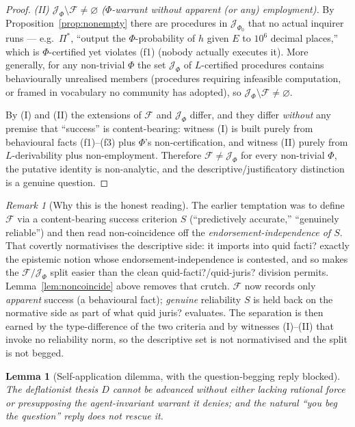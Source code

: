 \documentclass{amsart}
\theoremstyle{definition}
\theoremstyle{plain}
\newtheorem{lemma}{Lemma}
\theoremstyle{remark}
\newtheorem{remark}{Remark}
\begin{document}
\begin{proof}
\emph{(II) $\mathcal{J}_\Phi\setminus\mathcal{F}\neq\varnothing$
($\Phi$-warrant without apparent (or any) employment).} By
Proposition~\ref{prop:nonempty} there are procedures in $\mathcal{J}_{\Phi_0}$
that no actual inquirer runs --- e.g.\ $\Pi^\ast$, ``output the $\Phi$-probability
of $h$ given $E$ to $10^{6}$ decimal places,'' which is $\Phi$-certified yet
violates (f1) (nobody actually executes it). More generally, for any non-trivial
$\Phi$ the set $\mathcal{J}_\Phi$ of $L$-certified procedures contains
behaviourally unrealised members (procedures requiring infeasible computation,
or framed in vocabulary no community has adopted), so
$\mathcal{J}_\Phi\setminus\mathcal{F}\neq\varnothing$.

By (I) and (II) the extensions of $\mathcal{F}$ and $\mathcal{J}_\Phi$ differ,
and they differ \emph{without} any premise that ``success'' is content-bearing:
witness (I) is built purely from behavioural facts (f1)--(f3) plus $\Phi$'s
non-certification, and witness (II) purely from $L$-derivability plus
non-employment. Therefore $\mathcal{F}\neq\mathcal{J}_\Phi$ for every
non-trivial $\Phi$, the putative identity is non-analytic, and the
descriptive\slash justificatory distinction is a genuine question.
\end{proof}

\begin{remark}[Why this is the honest reading]\label{rem:behavioural}
The earlier temptation was to define $\mathcal{F}$ via a content-bearing
success criterion $S$ (``predictively accurate,'' ``genuinely reliable'') and
then read non-coincidence off the \emph{endorsement-independence of $S$}. That
covertly normativises the descriptive side: it imports into quid facti? exactly
the epistemic notion whose endorsement-independence is contested, and so makes
the $\mathcal{F}/\mathcal{J}_\Phi$ split easier than the clean
quid-facti?/quid-juris? division permits. Lemma~\ref{lem:noncoincide} above
removes that crutch. $\mathcal{F}$ now records only \emph{apparent} success
(a behavioural fact); \emph{genuine} reliability $S$ is held back on the
normative side as part of what quid juris? evaluates. The separation is then
earned by the type-difference of the two criteria and by witnesses (I)--(II)
that invoke no reliability norm, so the descriptive set is not normativised and
the split is not begged.
\end{remark}

\begin{lemma}[Self-application dilemma, with the question-begging reply blocked]
\label{lem:selfapp}
The deflationist thesis $D$ cannot be advanced without either lacking rational
force or presupposing the agent-invariant warrant it denies; and the natural
``you beg the question'' reply does not rescue it.
\end{lemma}
\end{document}
